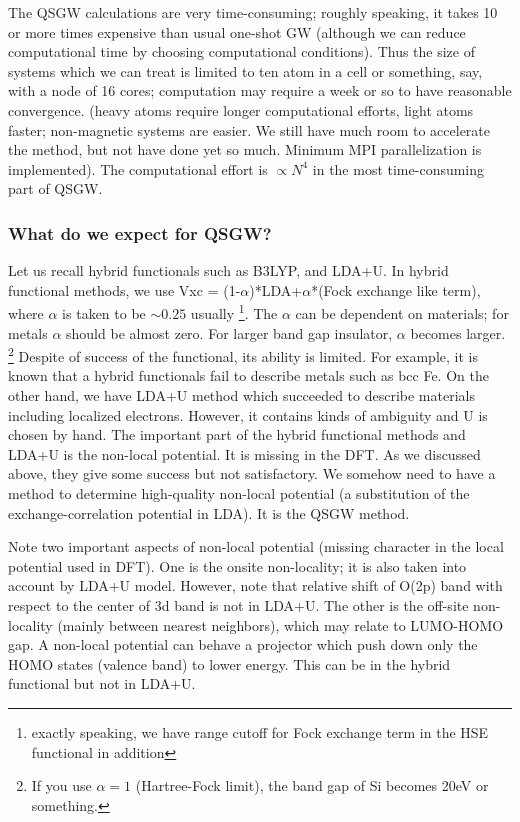 \documentclass[a4paper,10pt,epsf,fleqn]{article}
\begin{document}
The QSGW calculations are very time-consuming;
roughly speaking, it takes 10 or more times expensive than usual
one-shot GW (although we can reduce computational time by choosing
computational conditions). 
Thus the size of systems which we can treat is limited to ten atom in a
cell or something, say, with a node of 16 cores;
computation may require a week or so to have reasonable convergence.
(heavy atoms require longer computational efforts,
light atoms faster; non-magnetic systems are easier.
We still have much room to accelerate the method, but not have done
yet so much. Minimum MPI parallelization is implemented).
The computational effort is $\propto N^4$ 
in the most time-consuming part of QSGW.


\subsubsection{What do we expect for QSGW?}
Let us recall hybrid functionals such as B3LYP, and LDA+U.
In hybrid functional methods, 
we use Vxc = (1-$\alpha$)*LDA+$\alpha$*(Fock exchange like term),
where $\alpha$ is taken to be $\sim0.25$ usually 
\footnote{exactly speaking, we have range cutoff for Fock exchange term 
in the HSE functional in addition}.
The $\alpha$ can be dependent on materials; for metals $\alpha$ should be
almost zero. For larger band gap insulator, $\alpha$ becomes larger.
\footnote{If you use $\alpha=1$ (Hartree-Fock limit), 
the band gap of Si becomes 20eV or something.}
Despite of success of the functional, its ability is limited.
For example, it is known that a hybrid functionals fail to describe 
metals such as bcc Fe. 
On the other hand, we have LDA+U method which succeeded to describe
materials including localized electrons. However, it contains kinds of
ambiguity and U is chosen by hand.
The important part of the hybrid functional methods and LDA+U
is the non-local potential. It is missing in the DFT.
As we discussed above, they give some success but not satisfactory.
We somehow need to have a method to determine high-quality
non-local potential (a substitution of the exchange-correlation
potential in LDA). It is the QSGW method.

Note two important aspects of non-local potential (missing character 
in the local potential used in DFT). 
One is the onsite non-locality; it is also taken into account by LDA+U
model. However, note that relative shift of O(2p) band with respect
to the center of 3d band is not in LDA+U.
The other is the off-site non-locality (mainly between nearest neighbors),
which may relate to LUMO-HOMO gap. A non-local potential can behave a
projector which push down only the HOMO states (valence band) to lower energy.
This can be in the hybrid functional but not in LDA+U. 
\end{document}
